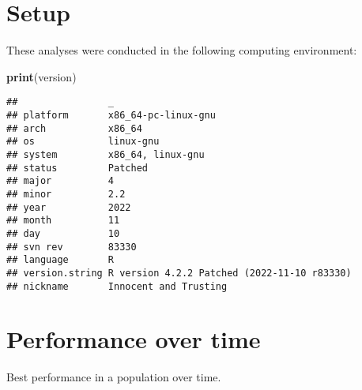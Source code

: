 \documentclass[]{book}
\newenvironment{Shaded}{\begin{snugshade}}{\end{snugshade}}
\newcommand{\CharTok}[1]{\textcolor[rgb]{0.31,0.60,0.02}{#1}}
\newcommand{\DataTypeTok}[1]{\textcolor[rgb]{0.13,0.29,0.53}{#1}}
\newcommand{\KeywordTok}[1]{\textcolor[rgb]{0.13,0.29,0.53}{\textbf{#1}}}
\newcommand{\NormalTok}[1]{#1}
\newcommand{\OperatorTok}[1]{\textcolor[rgb]{0.81,0.36,0.00}{\textbf{#1}}}
\newcommand{\StringTok}[1]{\textcolor[rgb]{0.31,0.60,0.02}{#1}}
\begin{document}
\hypertarget{setup}{%
\section{Setup}\label{setup}}

These analyses were conducted in the following computing environment:

\begin{Shaded}
\begin{Highlighting}[]
\KeywordTok{print}\NormalTok{(version)}
\end{Highlighting}
\end{Shaded}

\begin{verbatim}
##                _                                          
## platform       x86_64-pc-linux-gnu                        
## arch           x86_64                                     
## os             linux-gnu                                  
## system         x86_64, linux-gnu                          
## status         Patched                                    
## major          4                                          
## minor          2.2                                        
## year           2022                                       
## month          11                                         
## day            10                                         
## svn rev        83330                                      
## language       R                                          
## version.string R version 4.2.2 Patched (2022-11-10 r83330)
## nickname       Innocent and Trusting
\end{verbatim}

\hypertarget{performance-over-time}{%
\section{Performance over time}\label{performance-over-time}}

Best performance in a population over time.

\begin{Shaded}
\end{Shaded}
\end{document}
